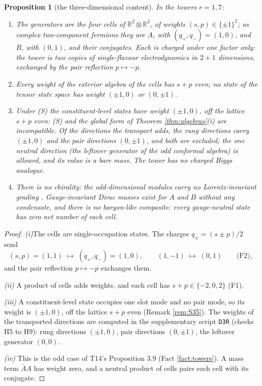 \documentclass[11pt]{article}
\newtheorem{proposition}[theorem]{Proposition}
\theoremstyle{definition}
\newcommand{\R}{\mathbb{R}}
\newcommand{\file}[1]{\texttt{#1}}
\newcommand{\pitem}[1]{\par\smallskip\noindent\textit{#1}\enspace}
\begin{document}
\begin{proposition}[the three-dimensional content]\label{prop:content3}
In the towers $r = 1, 7$:
\begin{enumerate}
\item[(i)] The generators are the four cells of $\R^{2} \otimes \R^{2}$, of weights $(s, p) \in \{\pm 1\}^{2}$; as complex two-component fermions they are $A$, with $(q_{+}, q_{-}) = (1, 0)$, and $B$, with $(0, 1)$, and their conjugates. Each is charged under one factor only: the tower is two copies of single-flavour electrodynamics in $2+1$ dimensions, exchanged by the pair reflection $p \mapsto -p$.
\item[(ii)] Every weight of the exterior algebra of the cells has $s + p$ even; no state of the tensor state space has weight $(\pm 1, 0)$ or $(0, \pm 1)$.
\item[(iii)] Under (S) the constituent-level states have weight $(\pm 1, 0)$, off the lattice $s + p$ even: (S) and the global form of Theorem \ref{thm:algebras}(i) are incompatible. Of the directions the transport adds, the rung directions carry $(\pm 1, 0)$ and the pair directions $(0, \pm 1)$, and both are excluded; the one neutral direction (the leftover generator of the odd conformal algebra) is allowed, and its value is a bare mass. The tower has no charged Higgs analogue.
\item[(iv)] There is no chirality: the odd-dimensional modules carry no Lorentz-invariant grading \cite[Prop.~3.9]{ButlerT14}. Gauge-invariant Dirac masses exist for $A$ and $B$ without any condensate, and there is no baryon-like composite: every gauge-neutral state has zero net number of each cell.
\end{enumerate}
\end{proposition}

\begin{proof}
\textit{(i)}\enspace The cells are single-occupation states. The charges $q_{\pm} = (s \pm p)/2$ send
\[
(s, p) = (1, 1) \;\mapsto\; (q_{+}, q_{-}) = (1, 0), \qquad (1, -1) \;\mapsto\; (0, 1) \qquad \text{(F2)},
\]
and the pair reflection $p \mapsto -p$ exchanges them.

\pitem{(ii)} A product of cells adds weights, and each cell has $s + p \in \{-2, 0, 2\}$ (F1).

\pitem{(iii)} A constituent-level state occupies one slot mode and no pair mode, so its weight is $(\pm 1, 0)$, off the lattice $s + p$ even (Remark \ref{rem:S35}). The weights of the transported directions are computed in the supplementary script \file{D3R} (checks H5 to H9): rung directions $(\pm 1, 0)$, pair directions $(0, \pm 1)$, the leftover generator $(0,0)$.

\pitem{(iv)} This is the odd case of T14's Proposition 3.9 (Fact \ref{fact:towers}). A mass term $\bar{A}A$ has weight zero, and a neutral product of cells pairs each cell with its conjugate.
\end{proof}
\end{document}
